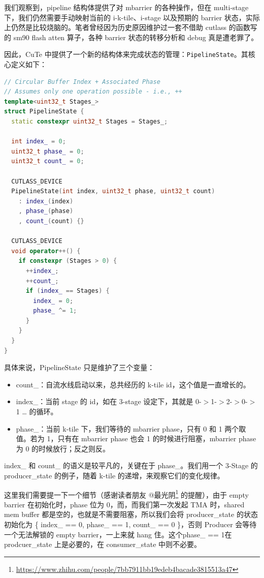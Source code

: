 我们观察到，pipeline 结构体提供了对 mbarrier 的各种操作，但在 multi-stage 下，我们仍然需要手动映射当前的 i-k-tile、i-stage 以及预期的 barrier 状态，实际上仍然是比较烧脑的。笔者曾经因为历史原因维护过一套不借助 cutlass 的函数写的 sm90 flash atten 算子，各种 barrier 状态的转移分析和 debug 真是遭老罪了。

因此，CuTe 中提供了一个新的结构体来完成状态的管理：\verb|PipelineState|。其核心定义如下：

\begin{lstlisting}[language=C++]
// Circular Buffer Index + Associated Phase
// Assumes only one operation possible - i.e., ++
template<uint32_t Stages_>
struct PipelineState {
  static constexpr uint32_t Stages = Stages_;

  int index_ = 0;
  uint32_t phase_ = 0;
  uint32_t count_ = 0;

  CUTLASS_DEVICE
  PipelineState(int index, uint32_t phase, uint32_t count)
    : index_(index)
    , phase_(phase)
    , count_(count) {}

  CUTLASS_DEVICE
  void operator++() {
    if constexpr (Stages > 0) {
      ++index_;
      ++count_;
      if (index_ == Stages) {
        index_ = 0;
        phase_ ^= 1;
      }
    }
  }
}
\end{lstlisting}

具体来说，PipelineState 只是维护了三个变量：

\begin{itemize}
  \item count\_：自流水线启动以来，总共经历的 k-tile id，这个值是一直增长的。
  \item index\_：当前 stage 的 id，如在 3-stage 设定下，其就是 0-$>$1-$>$2-$>$0-$>$1 … 的循环。
  \item phase\_：当前 k-tile 下，我们等待的 mbarrier phase，只有 0 和 1 两个取值。若为 1，只有在 mbarrier phase 也会 1 的时候进行阻塞，mbarrier phase 为 0 的时候放行；反之则反。
\end{itemize}

index\_ 和 count\_ 的语义是较平凡的，关键在于 phase\_。我们用一个 3-Stage 的 producer\_state 的例子，随着 k-tile 的递增，来观察它们的变化规律。

这里我们需要提一下一个细节（感谢读者朋友 @最光阴\footnote{\url{https://www.zhihu.com/people/7bb7911bb19edeb4bacade3815513a47}} 的提醒），由于 empty barrier 在初始化时，phase 位为 0，而，而我们第一次发起 TMA 时，shared mem buffer 都是空的，也就是不需要阻塞，所以我们会将 producer\_state 的状态初始化为 \{ index\_ == 0, phase\_ == 1, count\_ == 0 \}，否则 Producer 会等待一个无法解锁的 empty barrier，一上来就 hang 住。这个phase\_ == 1在 prodcuer\_state 上是必要的，在 consumer\_state 中则不必要。

